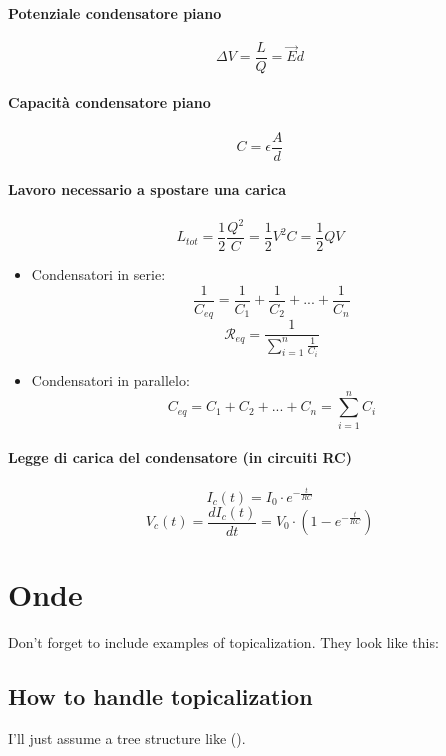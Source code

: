\documentclass[12pt]{article}
\begin{document}
    \paragraph*{Potenziale condensatore piano}
    \[\Delta V = \frac{L}{Q} = \vec{E}d\]
    \paragraph*{Capacità condensatore piano}
    \[C = \epsilon \frac{A}{d}\]
    \paragraph*{Lavoro necessario a spostare una carica}
    \[L_{tot} = \frac{1}{2}\frac{Q^2}{C} = \frac{1}{2}V^2C = \frac{1}{2}QV\]
    \begin{itemize}
        \item Condensatori in serie: \[\frac{1}{C_{eq}} = \frac{1}{C_{1}} + \frac{1}{C_{2}} + ... + \frac{1}{C_{n}}\]
        \[\mathcal{R}_{eq} = \frac{1}{\sum_{i = 1}^{n}{\frac{1}{C_i}}}\]
        \item Condensatori in parallelo: \[C_{eq} = C_1 + C_2 + ... + C_n = \sum_{i = 1}^{n}{C_i}\]
    \end{itemize}
    \paragraph*{Legge di carica del condensatore (in circuiti RC)}
    \[I_c(t) = I_0\cdot e^{-\frac{t}{RC}}\]
    \[V_c(t) = \frac{dI_c(t)}{dt} = V_0\cdot(1-e^{-\frac{t}{RC}})\]
    \section{Onde}

Don't forget to include examples of topicalization.
They look like this:

{\small
{}
}

\subsection*{How to handle topicalization}

I'll just assume a tree structure like ().
\end{document}
